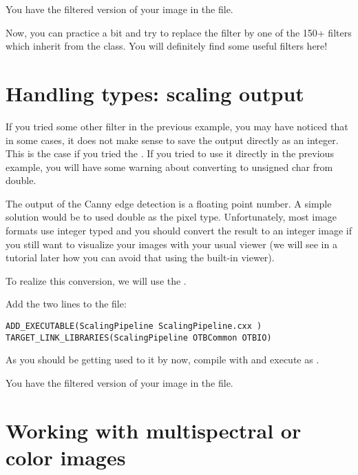 You have the filtered version of your image in the  file.

Now, you can practice a bit and try to replace the filter by one of the 150+
filters which inherit from the  class. You
will definitely find some useful filters here!

\section{Handling types: scaling output}
\label{sec:TutorialScaling}

If you tried some other filter in the previous example, you may have noticed
that in some cases, it does not make sense to save the output directly as an
integer. This is the case if you tried the
. If you tried to use it directly in
the previous example, you will have some warning about converting to unsigned
char from double.

The output of the Canny edge detection is a floating point number. A simple
solution would be to used double as the pixel type. Unfortunately, most image
formats use integer typed and you should convert the result to an integer image if you
still want to visualize your images with your usual viewer (we will see in a
tutorial later how you can avoid that using the built-in viewer).

To realize this conversion, we will use the
.

Add the two lines to the  file:

\begin{small}
\begin{verbatim}
ADD_EXECUTABLE(ScalingPipeline ScalingPipeline.cxx )
TARGET_LINK_LIBRARIES(ScalingPipeline OTBCommon OTBIO)
\end{verbatim}
\end{small}



As you should be getting used to it by now, compile with  and execute
as .
 
You have the filtered version of your image in the  file.

\section{Working with multispectral or color images}

